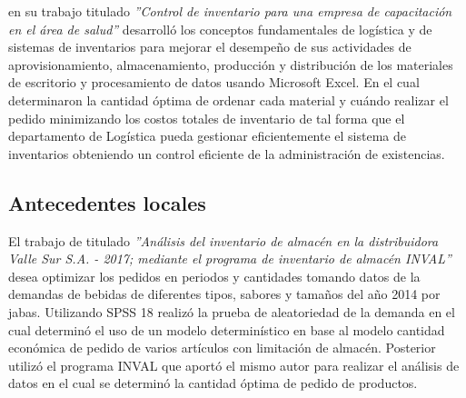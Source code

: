 \cite{caballero2007control} en su trabajo titulado \textsl{''Control de inventario para una empresa de capacitación en el área de salud''} desarrolló los conceptos fundamentales de logística y de sistemas de inventarios para mejorar el desempeño de sus actividades de aprovisionamiento, almacenamiento, producción y distribución de los materiales de escritorio y procesamiento de datos usando Microsoft Excel. En el cual determinaron la cantidad óptima de ordenar cada material y cuándo realizar el pedido minimizando los costos totales de inventario de tal forma que el departamento de Logística pueda gestionar eficientemente el sistema de inventarios obteniendo un control eficiente de la administración de existencias.
\subsection{Antecedentes locales}

El trabajo de \cite{koper2017analisis} titulado \textsl{''Análisis del inventario de almacén en la distribuidora Valle Sur S.A. - 2017; mediante el programa de inventario de almacén INVAL''} desea optimizar los pedidos en periodos y cantidades tomando datos de la demandas de bebidas de diferentes tipos, sabores y tamaños del año 2014 por jabas. Utilizando SPSS 18 realizó la prueba de aleatoriedad de la demanda en el cual determinó el uso de un modelo determinístico en base al modelo cantidad económica de pedido de varios artículos con limitación de almacén. Posterior utilizó el programa INVAL que aportó el mismo autor para realizar el análisis de datos en el cual se determinó la cantidad óptima de pedido de productos.
























